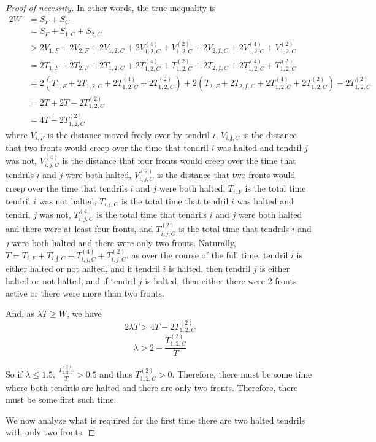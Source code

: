 \documentclass[12pt]{article}
\theoremstyle{plain}
\theoremstyle{definition}
\begin{document}
\begin{proof}[Proof of necessity]
In other words, the true inequality is 
\begin{align*}
2W&=S_F+S_C\\
&=S_F+S_{1,C}+S_{2,C}\\
&>2V_{1,F}+2V_{2,F}+2V_{1,\not2,C}+2V_{1,2,C}^{(4)}+V_{1,2,C}^{(2)}+2V_{2,\not1,C}+2V_{1,2,C}^{(4)}+V_{1,2,C}^{(2)}\\
&=2T_{1,F}+2T_{2,F}+2T_{1,\not2,C}+2T_{1,2,C}^{(4)}+T_{1,2,C}^{(2)}+2T_{2,\not1,C}+2T_{1,2,C}^{(4)}+T_{1,2,C}^{(2)}\\
&=2(T_{1,F}+2T_{1,\not2,C}+2T_{1,2,C}^{(4)}+2T_{1,2,C}^{(2)})+2(T_{2,F}+2T_{2,\not1,C}+2T_{1,2,C}^{(4)}+2T_{1,2,C}^{(2)})-2T_{1,2,C}^{(2)}\\
&=2T+2T-2T_{1,2,C}^{(2)}\\
&=4T-2T_{1,2,C}^{(2)}
\end{align*}
where \(V_{i,F}\) is the distance moved freely over by tendril \(i\),  \(V_{i,\not j, C}\) is the distance that two fronts would creep over the time that tendril \(i\) was halted and tendril \(j\) was not, \(V_{i, j, C}^{(4)}\) is the distance that four fronts would creep over the time that tendrils \(i\) and \(j\) were both halted, \(V_{i, j, C}^{(2)}\) is the distance that two fronts would creep over the time that tendrils \(i\) and \(j\) were both halted, \(T_{i,F}\) is the total time tendril \(i\) was not halted,  \(T_{i,\not j, C}\) is the total time that tendril \(i\) was halted and tendril \(j\) was not, \(T_{i, j, C}^{(4)}\) is the total time that tendrils \(i\) and \(j\) were both halted and there were at least four fronts, and \(T_{i, j, C}^{(2)}\) is the total time that tendrils \(i\) and \(j\) were both halted and there were only two fronts. Naturally, \(T=T_{i,F}+T_{i,\not j, C}+T_{i, j, C}^{(4)}+T_{i, j, C}^{(2)}\), as over the course of the full time, tendril \(i\) is either halted or not halted, and if tendril \(i\) is halted, then tendril \(j\) is either halted or not halted, and if tendril \(j\) is halted, then either there were 2 fronts active or there were more than two fronts. 

And, as \(\lambda T\geq W\), we have 
\[2\lambda T > 4T-2T_{1,2,C}^{(2)}\] 
\[\lambda > 2-\frac{T_{1,2,C}^{(2)}}{T}\] 

So if \(\lambda\leq 1.5\), \(\frac{T_{1,2,C}^{(2)}}{T}> 0.5 \) and thus \(T_{1,2,C}^{(2)}>0\). Therefore, there must be some time where both tendrils are halted and there are only two fronts. Therefore, there must be some first such time.

We now analyze what is required for the first time there are two halted tendrils with only two fronts. 


\end{proof}
\end{document}
